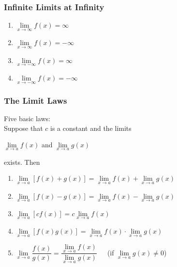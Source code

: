 	\begin{frame}
		\frametitle{Infinite Limits at Infinity}
		\begin{enumerate}
			\item $\lim\limits_{\textit{x} \to \infty}f(x) = \infty$
			\item $\lim\limits_{\textit{x} \to \infty}f(x) = -\infty$
			\item $\lim\limits_{\textit{x} \to -\infty}f(x) = \infty$
			\item $\lim\limits_{\textit{x} \to -\infty}f(x) = -\infty$
		\end{enumerate}
	\end{frame}
	\begin{frame}
		\frametitle{The Limit Laws}
		Five basic laws:\\
		Suppose that $c$ is a constant and the limits
		\begin{center}
			$\lim\limits_{\textit{x} \to a}f(x)$ and $\lim\limits_{\textit{x} \to a}g(x)$
		\end{center}
		exists. Then
		\begin{enumerate}
			\item $\lim\limits_{\textit{x} \to a}[f(x)+g(x)] = \lim\limits_{\textit{x} \to a}f(x) + \lim\limits_{\textit{x} \to a}g(x)$
			\item $\lim\limits_{\textit{x} \to a}[f(x)-g(x)] = \lim\limits_{\textit{x} \to a}f(x) - \lim\limits_{\textit{x} \to a}g(x)$
			\item $\lim\limits_{\textit{x} \to a}[cf(x)] = c\lim\limits_{\textit{x} \to a}f(x)$
			\item $\lim\limits_{\textit{x} \to a}[f(x)g(x)] = \lim\limits_{\textit{x} \to a}f(x) \cdot \lim\limits_{\textit{x} \to a}g(x)$
			\item $\lim\limits_{\textit{x} \to a}\dfrac{f(x)}{g(x)} = \dfrac{\lim\limits_{\textit{x} \to a}f(x)}{\lim\limits_{\textit{x} \to a}g(x)}$\ \ \  \alert{(if $\lim\limits_{\textit{x} \to a}g(x) \neq 0$)}
		\end{enumerate}
	\end{frame}
